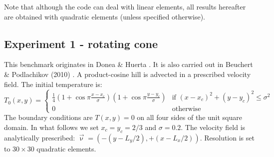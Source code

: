 Note that although the code can deal with linear elements, all results 
hereafter are obtained with quadratic elements (unless specified otherwise). 


\subsection*{Experiment 1 - rotating cone}

This benchmark originates in Donea \& Huerta \cite{dohu03}. 
It is also carried out in Beuchert \& Podlachikov (2010) \cite{bepo10}.
A product-cosine hill is advected in a prescribed velocity field. 
The initial temperature is:
\begin{equation}
T_0(x,y)=
\left\{
\begin{array}{cc}
\frac{1}{4}
\left(1+\cos \pi\frac{x-x_c}{\sigma}\right)
\left(1+\cos \pi\frac{y-y_c}{\sigma}\right)
& \text{if } (x-x_c)^2+(y-y_c)^2\leq \sigma^2 \\
0 & \text{otherwise}
\end{array}
\right.
\end{equation}
The boundary conditions are $T(x,y)=0$ on all four sides of the unit square domain. 
In what follows we set $x_c=y_c=2/3$ and $\sigma=0.2$.  
The velocity field is analytically prescribed: $\vec\upnu=(-(y-L_y/2),+(x-L_x/2))$.
Resolution is set to $30\times30$ quadratic elements.

